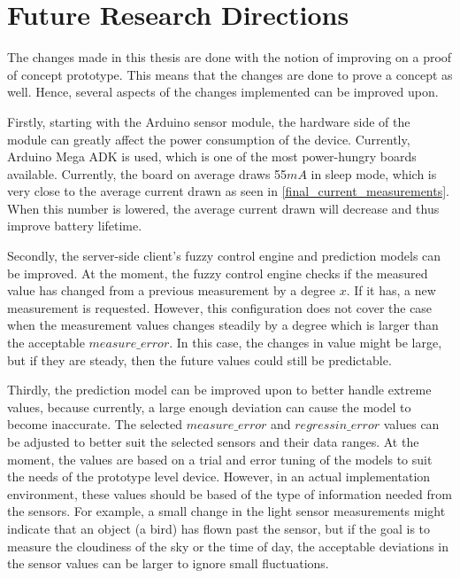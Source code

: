 

\chapter{Future Research Directions} %

The changes made in this thesis are done with the notion of improving on a proof of concept prototype. This means that the changes are done to prove a concept as well. 
Hence, several aspects of the changes implemented can be improved upon.

Firstly, starting with the Arduino sensor module, the hardware side of the module can greatly affect the power consumption of the device. Currently, Arduino Mega ADK is used, which is one of the most power-hungry boards available. Currently, the board on average draws 55$mA$ in sleep mode, which is very close to the average current drawn as seen in \autoref{final_current_measurements}. When this number is lowered, the average current drawn will decrease and thus improve battery lifetime. 

Secondly, the server-side client's fuzzy control engine and prediction models can be improved. At the moment, the fuzzy control engine checks if the measured value has changed from a previous measurement by a degree $x$. If it has, a new measurement is requested. However, this configuration does not cover the case when the measurement values changes steadily by a degree which is larger than the acceptable $measure\_error$. In this case, the changes in value might be large, but if they are steady, then the future values could still be predictable. 

Thirdly, the prediction model can be improved upon to better handle extreme values, because currently, a large enough deviation can cause the model to become inaccurate. The selected $measure\_error$ and $regressin\_error$ values can be adjusted to better suit the selected sensors and their data ranges. At the moment, the values are based on a trial and error tuning of the models to suit the needs of the prototype level device. However, in an actual implementation environment, these values should be based of the type of information needed from the sensors. For example, a small change in the light sensor measurements might indicate that an object (a bird) has flown past the sensor, but if the goal is to measure the cloudiness of the sky or the time of day, the acceptable deviations in the sensor values can be larger to ignore small fluctuations.  

